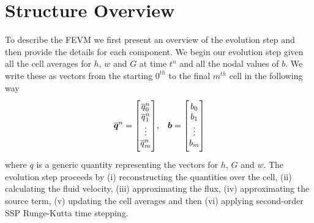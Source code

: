 \section{Structure Overview}
\label{sec:StructOverview}
To describe the FEVM we first present an overview of the evolution step and then provide the details for each component. We begin our evolution step given all the cell averages for $h$, $w$ and $G$ at time $t^n$ and all the nodal values of $b$. We write these as vectors from the starting $0^{th}$ to the final $m^{th}$ cell in the following way
\begin{align*} \overline{\vecn{q}}^n = \begin{bmatrix} \TM
\overline{q}_0^n \\\overline{q}_1^n \\ \vdots \\ \overline{q}_m^n \BM\end{bmatrix} & , & \vecn{b} = \begin{bmatrix} \TM
b_{0} \\ b_{1} \\ \vdots \\b_{m} \BM
\end{bmatrix} \\
\end{align*}
where $q$ is a generic quantity representing the vectors for $h$, $G$ and $w$. The evolution step proceeds by (i) reconstructing the quantities over the cell, (ii) calculating the fluid velocity, (iii) approximating the flux, (iv) approximating the source term, (v) updating the cell averages and then (vi) applying second-order SSP Runge-Kutta time stepping.

